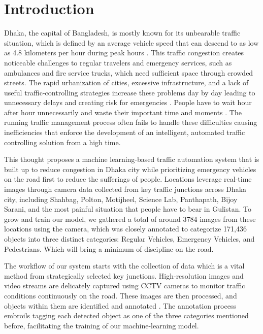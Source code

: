 \documentclass[usenatbib]{tjaa}
\begin{document}
\section[]{Introduction}
Dhaka, the capital of Bangladesh, is mostly known for its unbearable traffic situation, which is defined by an average vehicle speed that can descend to as low as 4.8 kilometers per hour during peak hours \citep{clar:a1}. This traffic congestion creates noticeable challenges to regular travelers and emergency services, such as ambulances and fire service trucks, which need sufficient space through crowded streets. The rapid urbanization of cities, excessive infrastructure, and a lack of useful traffic-controlling strategies increase these problems day by day leading to unnecessary delays and creating risk for emergencies \citep{clar:a16}. People have to wait hour after hour unnecessarily and waste their important time and moments \citep{clar:a2}. The running traffic management process often fails to handle these difficulties causing inefficiencies that enforce the development of an intelligent, automated traffic controlling solution from a high time. 


This thought proposes a machine learning-based traffic automation system that is built up to reduce congestion in Dhaka city while prioritizing emergency vehicles on the road first to reduce the sufferings of people. Locations leverage real-time images through camera data collected from key traffic junctions across Dhaka city, including Shahbag, Polton, Motijheel, Science Lab, Panthapath, Bijoy Sarani, and the most painful situation that people have to bear in Gulistan. To grow and train our model, we gathered a total of around 3784 images from these locations using the camera, which was closely annotated to categorize 171,436 objects into three distinct categories: Regular Vehicles, Emergency Vehicles, and Pedestrians. Which will bring a minimum of discipline on the road. 


The workflow of our system starts with the collection of data which is a vital method from strategically selected key junctions. High-resolution images and video streams are delicately captured using CCTV cameras to monitor traffic conditions continuously on the road. These images are then processed, and objects within them are identified and annotated \citep{clar:a3}. The annotation process embroils tagging each detected object as one of the three categories mentioned before, facilitating the training of our machine-learning model. 
\end{document}
